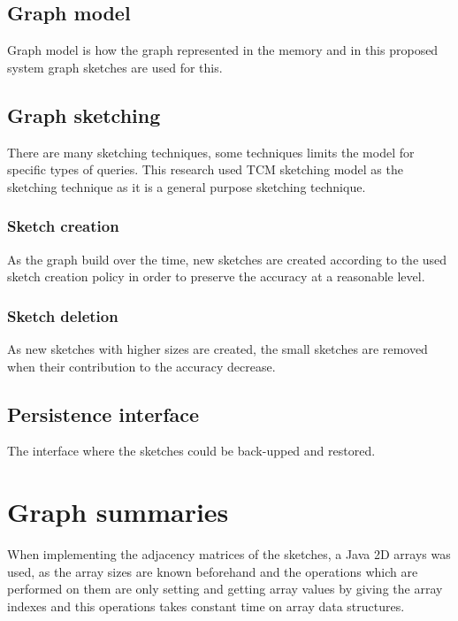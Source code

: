 \documentclass[12pt]{report}
\numberwithin{figure}{section}
\numberwithin{table}{section}
\begin{document}
\subsection*{Graph model}
Graph model is how the graph represented in the memory and in this proposed system graph sketches are used for this. 

\subsection*{Graph sketching}
There are many sketching techniques, some techniques limits the model for specific types of queries. This research used TCM sketching model as the sketching technique as it is a general purpose sketching technique.

\subsubsection*{Sketch creation}
As the graph build over the time, new sketches are created according to the used sketch creation policy in order to preserve the accuracy at a reasonable level.  

\subsubsection*{Sketch deletion}
As new sketches with higher sizes are created,  the small sketches are removed when their contribution to the accuracy decrease.

\subsection*{Persistence interface}
The interface where the sketches could be back-upped and restored.

\section{Graph summaries}
When implementing the adjacency matrices of the sketches, a Java 2D arrays was used, as the array sizes are known  beforehand and the operations which are performed on them are only setting and getting array values by giving the array indexes and this operations takes constant time on array data structures.

\paragraph{}
\end{document}
